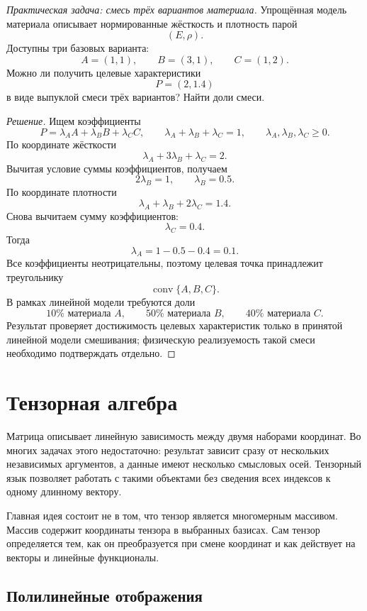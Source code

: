 \begin{problem}
\textit{Практическая задача: смесь трёх вариантов материала.}
Упрощённая модель материала описывает нормированные жёсткость и плотность парой
\[
(E,\rho).
\]
Доступны три базовых варианта:
\[
A=(1,1),
\qquad
B=(3,1),
\qquad
C=(1,2).
\]
Можно ли получить целевые характеристики
\[
P=(2,1.4)
\]
в виде выпуклой смеси трёх вариантов? Найти доли смеси.
\end{problem}

\begin{proof}[Решение]
Ищем коэффициенты
\[
P=\lambda_AA+\lambda_BB+\lambda_CC,
\qquad
\lambda_A+\lambda_B+\lambda_C=1,
\qquad
\lambda_A,\lambda_B,\lambda_C\geq0.
\]
По координате жёсткости
\[
\lambda_A+3\lambda_B+\lambda_C=2.
\]
Вычитая условие суммы коэффициентов, получаем
\[
2\lambda_B=1,
\qquad
\lambda_B=0.5.
\]
По координате плотности
\[
\lambda_A+\lambda_B+2\lambda_C=1.4.
\]
Снова вычитаем сумму коэффициентов:
\[
\lambda_C=0.4.
\]
Тогда
\[
\lambda_A=1-0.5-0.4=0.1.
\]
Все коэффициенты неотрицательны, поэтому целевая точка принадлежит треугольнику
\[
\operatorname{conv}\{A,B,C\}.
\]
В рамках линейной модели требуются доли
\[
10\% \text{ материала }A,\qquad
50\% \text{ материала }B,\qquad
40\% \text{ материала }C.
\]
Результат проверяет достижимость целевых характеристик только в принятой линейной модели смешивания; физическую реализуемость такой смеси необходимо подтверждать отдельно.
\end{proof}

\section{Тензорная алгебра}
\label{sec:tensor-algebra}

Матрица описывает линейную зависимость между двумя наборами координат. Во многих задачах этого недостаточно: результат зависит сразу от нескольких независимых аргументов, а данные имеют несколько смысловых осей. Тензорный язык позволяет работать с такими объектами без сведения всех индексов к одному длинному вектору.

Главная идея состоит не в том, что тензор является многомерным массивом. Массив содержит координаты тензора в выбранных базисах. Сам тензор определяется тем, как он преобразуется при смене координат и как действует на векторы и линейные функционалы.

\subsection{Полилинейные отображения}

